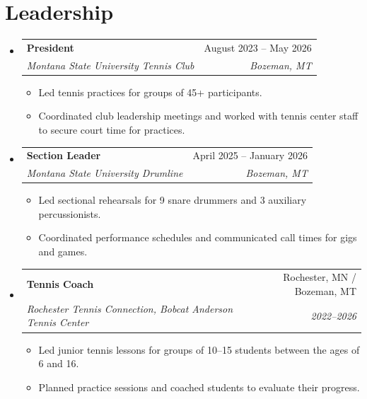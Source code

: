 \documentclass[letterpaper,11pt]{article}
\makeatletter
\newcommand{\resumeItem}[1]{
    \item\small{#1 \vspace{-2pt}}
}
\newcommand{\resumeSubheading}[4]{
    \vspace{3pt}\item
    \begin{tabular*}{0.97\textwidth}[t]{l@{\extracolsep{\fill}}r}
    \textbf{#1} & \small#2 \\
    \textit{\small#3} & \textit{\small #4} \\
    \end{tabular*}\vspace{-5pt}
}
\newcommand{\resumeSubHeadingListStart}{\begin{itemize}[leftmargin=0.15in, label={}]}
\newcommand{\resumeSubHeadingListEnd}{\end{itemize}}
\newcommand{\resumeItemListStart}{\begin{itemize}}
\newcommand{\resumeItemListEnd}{\end{itemize}\vspace{-5pt}}
\makeatother
\begin{document}


    \section{Leadership}
    \resumeSubHeadingListStart

    \resumeSubheading
    {President}{August 2023 -- May 2026}
    {Montana State University Tennis Club}{Bozeman, MT}
    \resumeItemListStart
        \resumeItem{Led tennis practices for groups of 45+ participants.}
        \resumeItem{Coordinated club leadership meetings and worked with tennis center staff to secure court time for practices.}
    \resumeItemListEnd

    \resumeSubheading
    {Section Leader}{April 2025 -- January 2026}
    {Montana State University Drumline}{Bozeman, MT}
    \resumeItemListStart
        \resumeItem{Led sectional rehearsals for 9 snare drummers and 3 auxiliary percussionists.}
        \resumeItem{Coordinated performance schedules and communicated call times for gigs and games.}
    \resumeItemListEnd

    \resumeSubheading{Tennis Coach}{Rochester, MN / Bozeman, MT}{Rochester Tennis Connection, Bobcat Anderson Tennis Center}{2022--2026}
    \resumeItemListStart
        \resumeItem{Led junior tennis lessons for groups of 10--15 students between the ages of 6 and 16.}
        \resumeItem{Planned practice sessions and coached students to evaluate their progress.}
    \resumeItemListEnd

    \resumeSubHeadingListEnd

\end{document}
